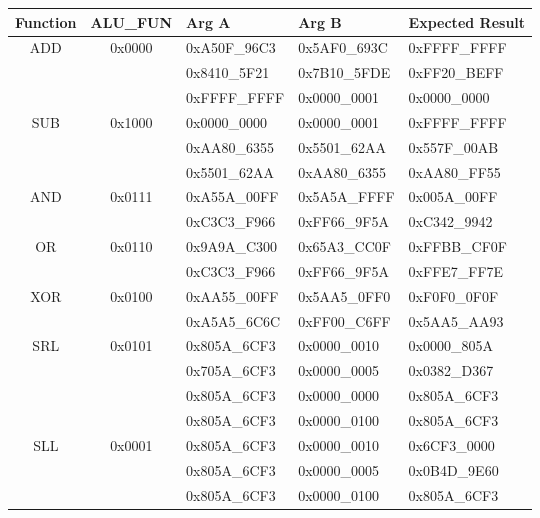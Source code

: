 \documentclass[a4paper]{report}
\begin{document}
				\begin{table}[H]
					\centering
					\begin{tabular}{||c|c|l|l|l||}
						\hline
						\textbf{Function} & \textbf{ALU\_FUN}  & \textbf{Arg A} & \textbf{Arg B} & \textbf{Expected Result} \\\hline
						ADD & 0x0000 & 0xA50F\_96C3  & 0x5AF0\_693C & 0xFFFF\_FFFF  \\\hline
							&  		 & 0x8410\_5F21  & 0x7B10\_5FDE & 0xFF20\_BEFF  \\\hline
							&  		 & 0xFFFF\_FFFF  & 0x0000\_0001 & 0x0000\_0000  \\\hline

						\hiderowcolors
						SUB & 0x1000 & 0x0000\_0000  & 0x0000\_0001 & 0xFFFF\_FFFF  \\\hline
							&  		 & 0xAA80\_6355  & 0x5501\_62AA & 0x557F\_00AB  \\\hline
							&  		 & 0x5501\_62AA  & 0xAA80\_6355 & 0xAA80\_FF55  \\\hline

						\showrowcolors
						AND & 0x0111 & 0xA55A\_00FF  & 0x5A5A\_FFFF & 0x005A\_00FF  \\\hline
							&  		 & 0xC3C3\_F966  & 0xFF66\_9F5A & 0xC342\_9942  \\\hline

						\hiderowcolors
						 OR & 0x0110 & 0x9A9A\_C300  & 0x65A3\_CC0F & 0xFFBB\_CF0F  \\\hline
						 	& 		 & 0xC3C3\_F966  & 0xFF66\_9F5A & 0xFFE7\_FF7E  \\\hline

						\showrowcolors
						XOR & 0x0100 & 0xAA55\_00FF  & 0x5AA5\_0FF0 & 0xF0F0\_0F0F  \\\hline
							& 		 & 0xA5A5\_6C6C  & 0xFF00\_C6FF & 0x5AA5\_AA93  \\\hline

						\hiderowcolors
						SRL & 0x0101 & 0x805A\_6CF3  & 0x0000\_0010 & 0x0000\_805A  \\\hline
							&		 & 0x705A\_6CF3  & 0x0000\_0005 & 0x0382\_D367  \\\hline
							&  		 & 0x805A\_6CF3  & 0x0000\_0000 & 0x805A\_6CF3  \\\hline
							&		 & 0x805A\_6CF3  & 0x0000\_0100 & 0x805A\_6CF3  \\\hline

						\showrowcolors
						SLL & 0x0001 & 0x805A\_6CF3  & 0x0000\_0010 & 0x6CF3\_0000  \\\hline
							&  		 & 0x805A\_6CF3  & 0x0000\_0005 & 0x0B4D\_9E60  \\\hline
							&		 & 0x805A\_6CF3  & 0x0000\_0100 & 0x805A\_6CF3  \\\hline


\end{tabular}
\end{table}
\end{document}
